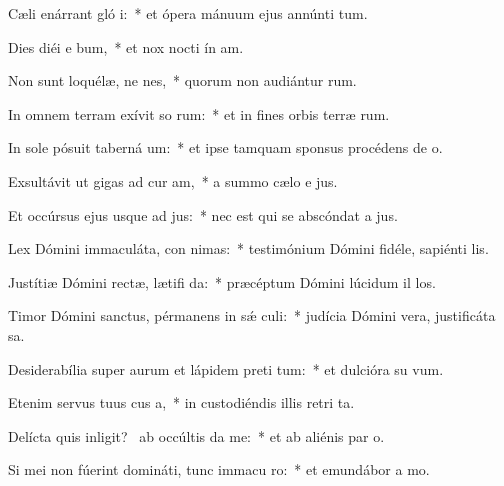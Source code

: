 \item Cæli enárrant gló i:~* et ópera mánuum ejus annúnti tum.
\item Dies diéi e bum,~* et nox nocti ín am.
\item Non sunt loquélæ, ne nes,~* quorum non audiántur  rum.
\item In omnem terram exívit so rum:~* et in fines orbis terræ  rum.
\item In sole pósuit taberná um:~* et ipse tamquam sponsus procédens de  o.
\item Exsultávit ut gigas ad cur am,~* a summo cælo e jus.
\item Et occúrsus ejus usque ad  jus:~* nec est qui se abscóndat a  jus.
\item Lex Dómini immaculáta, con nimas:~* testimónium Dómini fidéle, sapiénti  lis.
\item Justítiæ Dómini rectæ, lætifi da:~* præcéptum Dómini lúcidum il los.
\item Timor Dómini sanctus, pérmanens in sǽ culi:~* judícia Dómini vera, justificáta  sa.
\item Desiderabília super aurum et lápidem preti tum:~* et dulcióra su   vum.
\item Etenim servus tuus cus a,~* in custodiéndis illis retri ta.
\item Delícta quis inligit?~\pscross{} ab occúltis  da me:~* et ab aliénis par  o.
\item Si mei non fúerint domináti, tunc immacu ro:~* et emundábor a  mo.
